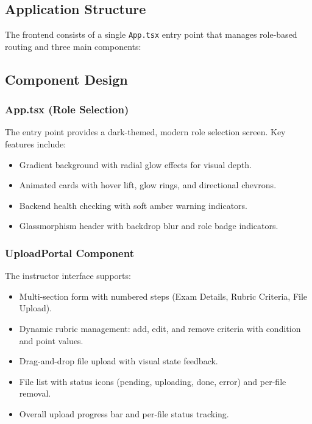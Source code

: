 \documentclass[11pt,a4paper]{article}
\begin{document}
\subsection{Application Structure}

The frontend consists of a single \texttt{App.tsx} entry point that manages role-based routing and three main components:

\subsection{Component Design}

\subsubsection{App.tsx (Role Selection)}
The entry point provides a dark-themed, modern role selection screen. Key features include:

\begin{itemize}[leftmargin=2em]
    \item Gradient background with radial glow effects for visual depth.
    \item Animated cards with hover lift, glow rings, and directional chevrons.
    \item Backend health checking with soft amber warning indicators.
    \item Glassmorphism header with backdrop blur and role badge indicators.
\end{itemize}

\subsubsection{UploadPortal Component}
The instructor interface supports:

\begin{itemize}[leftmargin=2em]
    \item Multi-section form with numbered steps (Exam Details, Rubric Criteria, File Upload).
    \item Dynamic rubric management: add, edit, and remove criteria with condition and point values.
    \item Drag-and-drop file upload with visual state feedback.
    \item File list with status icons (pending, uploading, done, error) and per-file removal.
    \item Overall upload progress bar and per-file status tracking.
\end{itemize}
\end{document}
